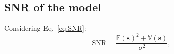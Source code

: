 \begin{comment}
If $\mathbf{s}=\mathbf{0}$ (a constant signal
with zeros), Equations \ref{eq:E_ZAWG} and \ref{eq:V_ZAWG}
reduce to
\begin{equation}
  \mathbb{E}(\mathbf{\hat{\mathbf{s}}}) = 0,
\end{equation}
and
\begin{equation}
  \mathbb{V}(\hat{\mathbf{s}}) = \sigma^2,
\end{equation}
respectively, and if $\mathbf{s}=\mathbf{1}$ (a constant signal with
ones)
\begin{equation}
  \mathbb{E}(\hat{\mathbf{s}}) = \mathbb{E}(\mathbf{1}) = 1,
\end{equation}
and
\begin{equation}
  \mathbb{V}(\hat{\mathbf{s}}) = \sigma^2.
\end{equation}
\end{comment}

\subsection{\gls{SNR} of the model}
Considering Eq.~\ref{eq:SNR}: %
\begin{equation}
  \text{SNR} = \frac{\mathbb{E}(\mathbf{s})^2 + \mathbb{V}(\mathbf{s})}{\sigma^2},
\end{equation}

\begin{comment}
that
\begin{equation}
  \mathbb{E}(\mathbf{s}) = \mathbf{s},
  \label{eq:E_constant}
\end{equation}
that $\hat{\mathbf{s}}$ is an unbiased estimator of $\mathbf{s}$, i.e.,
\begin{equation}
  \lim_{N\rightarrow\infty}\frac{1}{N}\sum_{n=0}^{N-1}\hat{\mathbf{s}}^{(n)} = \mathbf{s},
\end{equation}
where $\hat{\mathbf{s}}^{(n)}$ is the $n$-th noisy instance of
$\mathbf{s}$, and using Eq.~\ref{eq:SNR_distribution}, we come to
\begin{equation}
  \text{SNR} = \frac{\textbf{s}}{\sigma} = \frac{\hat{\textbf{s}}}{\sigma},
  \label{eq:SNR_ZAWG}
\end{equation}
and therefore to
\begin{equation}
  \text{SNR}_i = \frac{\hat{\textbf{s}}_i}{\sigma}.
  \label{eq:SNR_ZAWG_i}
\end{equation}
\end{comment}

